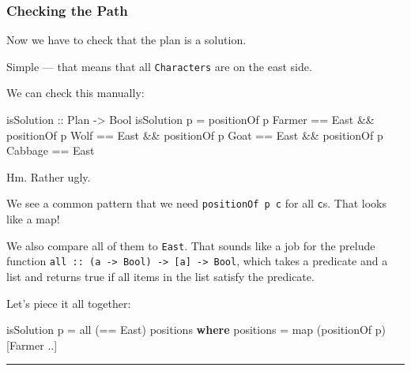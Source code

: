 \documentclass[]{article}
\newenvironment{Shaded}{}{}
\newcommand{\KeywordTok}[1]{\textcolor[rgb]{0.00,0.44,0.13}{\textbf{{#1}}}}
\newcommand{\DataTypeTok}[1]{\textcolor[rgb]{0.56,0.13,0.00}{{#1}}}
\newcommand{\OtherTok}[1]{\textcolor[rgb]{0.00,0.44,0.13}{{#1}}}
\newcommand{\FunctionTok}[1]{\textcolor[rgb]{0.02,0.16,0.49}{{#1}}}
\newcommand{\NormalTok}[1]{{#1}}
\begin{document}
\subsubsection{Checking the Path}\label{checking-the-path}

Now we have to check that the plan is a solution.

Simple --- that means that all \texttt{Characters} are on the east side.

We can check this manually:

\begin{Shaded}
\begin{Highlighting}[]
\OtherTok{isSolution ::} \DataTypeTok{Plan} \OtherTok{->} \DataTypeTok{Bool}
\NormalTok{isSolution p }\FunctionTok{=}
    \NormalTok{positionOf p }\DataTypeTok{Farmer} \FunctionTok{==} \DataTypeTok{East}
    \FunctionTok{&&} \NormalTok{positionOf p }\DataTypeTok{Wolf} \FunctionTok{==} \DataTypeTok{East}
    \FunctionTok{&&} \NormalTok{positionOf p }\DataTypeTok{Goat} \FunctionTok{==} \DataTypeTok{East}
    \FunctionTok{&&} \NormalTok{positionOf p }\DataTypeTok{Cabbage} \FunctionTok{==} \DataTypeTok{East}
\end{Highlighting}
\end{Shaded}

Hm. Rather ugly.

We see a common pattern that we need \texttt{positionOf\ p\ c} for all
\texttt{c}s. That looks like a map!

We also compare all of them to \texttt{East}. That sounds like a job for the
prelude function
\texttt{all\ ::\ (a\ -\textgreater{}\ Bool)\ -\textgreater{}\ {[}a{]}\ -\textgreater{}\ Bool},
which takes a predicate and a list and returns true if all items in the list
satisfy the predicate.

Let's piece it all together:

\begin{Shaded}
\begin{Highlighting}[]
\NormalTok{isSolution p }\FunctionTok{=} \NormalTok{all (}\FunctionTok{==} \DataTypeTok{East}\NormalTok{) positions}
    \KeywordTok{where}
        \NormalTok{positions }\FunctionTok{=} \NormalTok{map (positionOf p) [}\DataTypeTok{Farmer} \FunctionTok{..}\NormalTok{]}
\end{Highlighting}
\end{Shaded}

\begin{center}\rule{0.5\linewidth}{\linethickness}\end{center}
\end{document}

